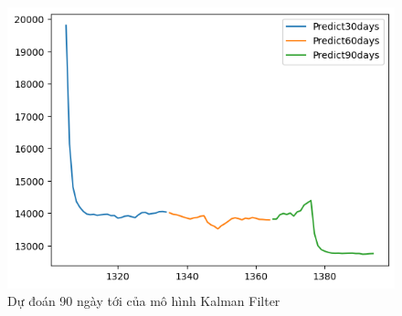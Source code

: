 \begin{figure}[H]
\begin{minipage}{0.15\textwidth}
    \includegraphics[width=1\textwidth]{resources/chapter-5/newdata1/predicted/KF_EXIM_9_1_30days.png}
    \end{minipage}
    \hfill
    
    \caption{Dự đoán 90 ngày tới của mô hình Kalman Filter}
    \label{fig:kalman_filter_30days}
\end{figure}



